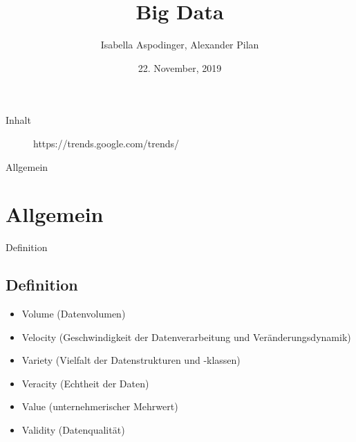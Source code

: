 \documentclass[11pt]{beamer}
\author{Isabella Aspodinger, Alexander Pilan}
\title{Big Data}
\institute{Paris Lodron Universität Salzburg}
\date{22. November, 2019}
\begin{document}
\begin{frame}
\titlepage
\end{frame}

\begin{frame}{Inhalt}
\tableofcontents
\end{frame}

\begin{frame}
\begin{figure}[h]
		\caption{https://trends.google.com/trends/}
		\label{ris:image}
	\end{figure}
\end{frame}

\begin{frame}{Allgemein}
\section{Allgemein}
\end{frame}

\begin{frame}{Definition}
\subsection{Definition}


	\begin{itemize}
	\item Volume (Datenvolumen)
	\item Velocity (Geschwindigkeit der Datenverarbeitung und Veränderungsdynamik)
	\item Variety (Vielfalt der Datenstrukturen und -klassen)
	\item Veracity (Echtheit der Daten)
	\item Value (unternehmerischer Mehrwert)
	\item Validity (Datenqualität)
	\end{itemize}




\end{frame}
\end{document}
